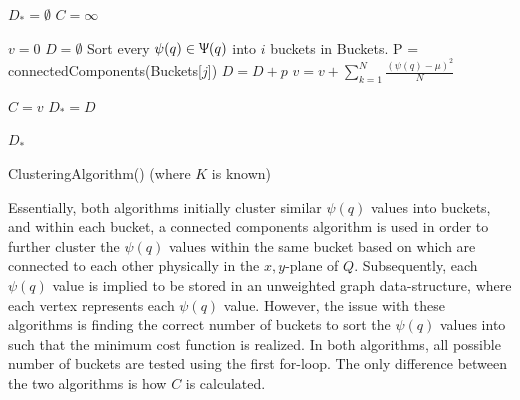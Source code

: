 \documentclass[conference]{IEEEtran}
\theoremstyle{plain}%
\begin{document}
\begin{algorithm}
\begin{algorithmic}[1]
\STATE $D_* = \emptyset$
\STATE $C = \infty$ 

\STATE $v = 0$ 
\STATE $D = \emptyset$ 
\STATE Sort every $\psi(q) \in \Uppsi(q)$ into $i$ buckets in Buckets.
\STATE P = connectedComponents(Buckets[$j$])
\STATE $D = D + p$
\STATE $v = v + \sum_{k=1}^{N} \frac{(\psi(q)-\mu)^2}{N}$ 
\ENDFOR
\ENDFOR

\STATE $C = v$
\STATE $D_* = D$
\ENDIF

\ENDFOR

\RETURN $D_*$
\end{algorithmic}
\caption{ClusteringAlgorithm() (where $K$ is known)} 
\label{alg:clustering_2}
\end{algorithm}

Essentially, both algorithms initially cluster similar $\psi(q)$ values into buckets, and within each bucket, a connected components algorithm is used in order to further cluster the $\psi(q)$ values within the same bucket based on which are connected to each other physically in the $x,y$-plane of $Q$. Subsequently, each $\psi(q)$ value is implied to be stored in an unweighted graph data-structure, where each vertex represents each $\psi(q)$ value. However, the issue with these algorithms is finding the correct number of buckets to sort the $\psi(q)$ values into such that the minimum cost function is realized. In both algorithms, all possible number of buckets are tested using the first for-loop. The only difference between the two algorithms is how $C$ is calculated. 
\end{document}
